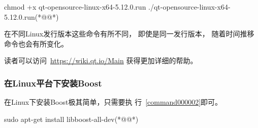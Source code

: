 {}\label{command000001}    %
\begin{thebookfilesourceonecommand}[escapeinside={(*@}{@*)},
caption=GoodLuck,
title=\commandnumbernameone \thecommandnumber
]
chmod +x qt-opensource-linux-x64-5.12.0.run
./qt-opensource-linux-x64-5.12.0.run(*@\marginpar[\hfill\setlength\fboxsep{2pt}\fbox{\footnotesize{\kaishu\parbox{1em}{\setlength{\baselineskip}{2pt}\commandnumbernameone}}\footnotesize{\thecommandnumber}}]{\setlength\fboxsep{2pt}\fbox{\footnotesize{\kaishu\parbox{1em}{\setlength{\baselineskip}{2pt}\commandnumbernameone}}\footnotesize{\thecommandnumber}}}@*)\end{thebookfilesourceonecommand}          %
\addtocounter{lstlisting}{-1}   %


在不同Linux发行版本这些命令有所不同，
即使是同一发行版本，
随着时间推移命令也会有所变化。

读者可以访问\ \url{https://wiki.qt.io/Main}
获得更加详细的帮助。




\FloatBarrier
\subsubsection{
在Linux平台下安装Boost
}\label{ss000510}



在Linux下安装Boost极其简单，只需要执
行\commandnumbernameone\ \ref{command000002}即可。

{}\label{command000002}    %
\begin{thebookfilesourceonecommand}[escapeinside={(*@}{@*)},
caption=GoodLuck,
title=\commandnumbernameone \thecommandnumber
]
sudo apt-get install libboost-all-dev(*@\marginpar[\hfill\setlength\fboxsep{2pt}\fbox{\footnotesize{\kaishu\parbox{1em}{\setlength{\baselineskip}{2pt}\commandnumbernameone}}\footnotesize{\thecommandnumber}}]{\setlength\fboxsep{2pt}\fbox{\footnotesize{\kaishu\parbox{1em}{\setlength{\baselineskip}{2pt}\commandnumbernameone}}\footnotesize{\thecommandnumber}}}@*)\end{thebookfilesourceonecommand}          %
\addtocounter{lstlisting}{-1}   %



